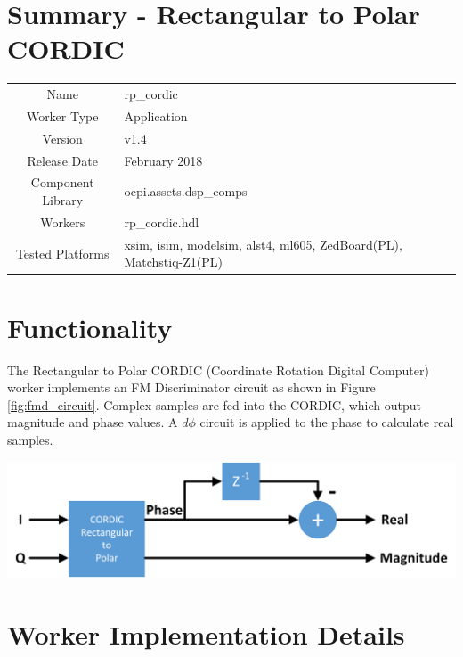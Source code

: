 \documentclass{article}
\author{} %
\date{Version \docVersion} %
\title{\docTitle}
\def\docVersion{1.4}
\def\comp{rp\_cordic}
\def\Comp{Rectangular to Polar CORDIC}
\begin{document}
\section*{Summary - \Comp}
\begin{tabular}{|c|M{13.5cm}|}
	\hline
	                  &                                                    \\
	\hline
	Name              & \comp                                              \\
	\hline
	Worker Type       & Application                                        \\
	\hline
	Version           & v\docVersion \\
	\hline
	Release Date      & February 2018 \\
	\hline
	Component Library & ocpi.assets.dsp\_comps                              \\
	\hline
	Workers           & \comp.hdl                                          \\
	\hline
	Tested Platforms  & xsim, isim, modelsim, alst4, ml605, ZedBoard(PL), Matchstiq-Z1(PL) \\
	\hline
\end{tabular}

\section*{Functionality}
\begin{flushleft}
	The Rectangular to Polar CORDIC (Coordinate Rotation Digital Computer) worker implements an FM Discriminator circuit as shown in Figure \ref{fig:fmd_circuit}. Complex samples are fed into the CORDIC, which output magnitude and phase values. A $d\phi$ circuit is applied to the phase to calculate real samples.
\end{flushleft}
{\centering\captionsetup{type=figure}\includegraphics[scale=0.8]{fmd_circuit}\par{}\label{fig:fmd_circuit}}

\section*{Worker Implementation Details}
\end{document}
